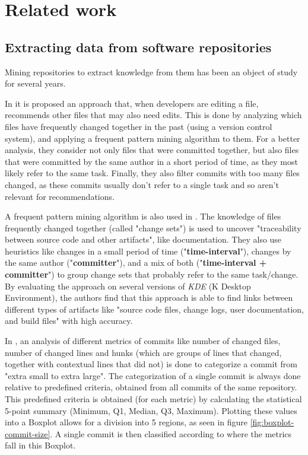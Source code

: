 \section{Related work}
\subsection{Extracting data from software repositories}

Mining repositories to extract knowledge from them has been an object of study for several years.

In \cite{Ying_2004} it is proposed an approach that, when developers are editing a file, recommends other files that may also need edits. This is done by analyzing which files have frequently changed together in the past (using a version control system), and applying a frequent pattern mining algorithm to them. For a better analysis, they consider not only files that were committed together, but also files that were committed by the same author in a short period of time, as they most likely refer to the same task. Finally, they also filter commits with too many files changed, as these commits usually don't refer to a single task and so aren't relevant for recommendations.

A frequent pattern mining algorithm is also used in \cite{Kagdi_2007}. The knowledge of files frequently changed together (called "change sets") is used to uncover "traceability between source code and other artifacts", like documentation. They also use heuristics like changes in a small period of time ("\textbf{time-interval}"), changes by the same author ("\textbf{committer}"), and a mix of both ("\textbf{time-interval + committer}") to group change sets that probably refer to the same task/change. By evaluating the approach on several versions of \textit{KDE} (K Desktop Environment), the authors find that this approach is able to find links between different types of artifacts like "source code files, change logs, user documentation, and build files" with high accuracy.

In \cite{Alali_2008}, an analysis of different metrics of commits like number of changed files, number of changed lines and hunks (which are groups of lines that changed, together with contextual lines that did not) is done to categorize a commit from "extra small to extra large". The categorization of a single commit is always done relative to predefined criteria, obtained from all commits of the same repository. This predefined criteria is obtained (for each metric) by calculating the statistical 5-point summary (Minimum, Q1, Median, Q3, Maximum). Plotting these values into a Boxplot allows for a division into 5 regions, as seen in figure \ref{fig:boxplot-commit-size}. A single commit is then classified according to where the metrics fall in this Boxplot.

